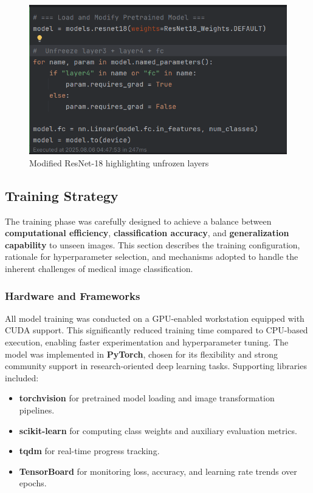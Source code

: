 \documentclass[
  12pt,
  oneside]{article}
\providecommand{\tightlist}{%
  \setlength{\itemsep}{0pt}\setlength{\parskip}{0pt}}
\begin{document}
\begin{figure}

{\centering \includegraphics[width=0.9\linewidth]{unfrozen_layers} 

}

\caption{Modified ResNet-18 highlighting unfrozen layers}\label{fig:unnamed-chunk-4}
\end{figure}

\subsection{Training Strategy}\label{training-strategy}

The training phase was carefully designed to achieve a balance between
\textbf{computational efficiency}, \textbf{classification accuracy}, and
\textbf{generalization capability} to unseen images. This section
describes the training configuration, rationale for hyperparameter
selection, and mechanisms adopted to handle the inherent challenges of
medical image classification.

\subsubsection{Hardware and Frameworks}\label{hardware-and-frameworks}

All model training was conducted on a GPU-enabled workstation equipped
with CUDA support. This significantly reduced training time compared to
CPU-based execution, enabling faster experimentation and hyperparameter
tuning. The model was implemented in \textbf{PyTorch}, chosen for its
flexibility and strong community support in research-oriented deep
learning tasks. Supporting libraries included:

\begin{itemize}
\tightlist
\item
  \textbf{torchvision} for pretrained model loading and image
  transformation pipelines.
\item
  \textbf{scikit-learn} for computing class weights and auxiliary
  evaluation metrics.
\item
  \textbf{tqdm} for real-time progress tracking.
\item
  \textbf{TensorBoard} for monitoring loss, accuracy, and learning rate
  trends over epochs.
\end{itemize}
\end{document}
